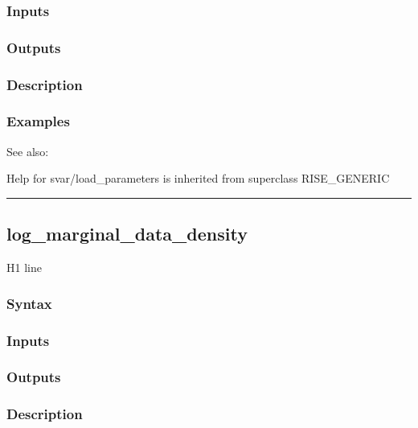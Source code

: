 \documentclass[letterpaper,10pt,english]{sphinxmanual}
\begin{document}
\subsubsection{Inputs}
\label{classes/models/@svar/svar:id46}

\subsubsection{Outputs}
\label{classes/models/@svar/svar:id47}

\subsubsection{Description}
\label{classes/models/@svar/svar:id48}

\subsubsection{Examples}
\label{classes/models/@svar/svar:id49}
See also:

Help for svar/load\_parameters is inherited from superclass RISE\_GENERIC


\bigskip\hrule{}\bigskip



\subsection{log\_marginal\_data\_density}
\label{classes/models/@svar/svar:id50}\label{classes/models/@svar/svar:log-marginal-data-density}
H1 line


\subsubsection{Syntax}
\label{classes/models/@svar/svar:id51}

\subsubsection{Inputs}
\label{classes/models/@svar/svar:id52}

\subsubsection{Outputs}
\label{classes/models/@svar/svar:id53}

\subsubsection{Description}
\label{classes/models/@svar/svar:id54}
\end{document}
